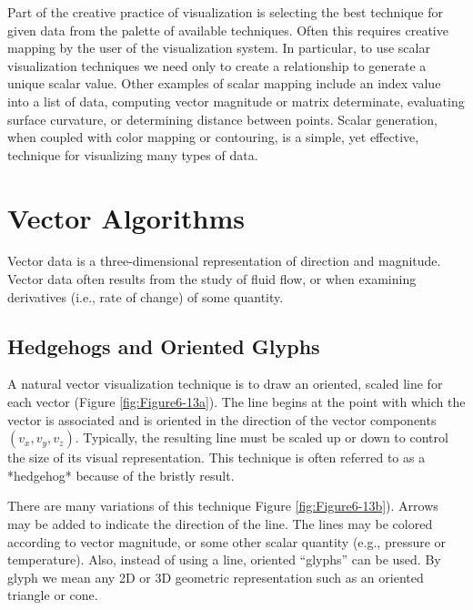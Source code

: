 Part of the creative practice of visualization is selecting the best technique for given data from the palette of available techniques. Often this requires creative mapping by the user of the visualization system. In particular, to use scalar visualization techniques we need only to create a relationship to generate a unique scalar value. Other examples of scalar mapping include an index value into a list of data, computing vector magnitude or matrix determinate, evaluating surface curvature, or determining distance between points. Scalar generation, when coupled with color mapping or contouring, is a simple, yet effective, technique for visualizing many types of data.

\section{Vector Algorithms}

Vector data is a three-dimensional representation of direction and magnitude. Vector data often results from the study of fluid flow, or when examining derivatives (i.e., rate of change) of some quantity.

\subsection{Hedgehogs and Oriented Glyphs}

A natural vector visualization technique is to draw an oriented,
scaled line for each vector (Figure \ref{fig:Figure6-13a}). The line begins at the point with which the vector is associated and is oriented in the direction of the vector components $(v_x, v_y, v_z)$. Typically, the resulting line must be scaled up or down to control the size of its visual representation. This technique is often referred to as a *hedgehog* because of the bristly result.

There are many variations of this technique Figure \ref{fig:Figure6-13b}). Arrows may be added to indicate the direction of the line. The lines may be colored according to vector magnitude, or some other scalar quantity (e.g., pressure or temperature). Also, instead of using a line, oriented ``glyphs'' can be used. By glyph we mean any 2D or 3D geometric representation such as an oriented triangle or cone.

